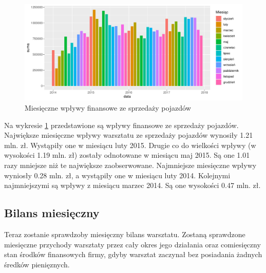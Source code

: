 \documentclass{article}\usepackage[]{graphicx}\usepackage[]{xcolor}
\makeatletter
\def\maxwidth{ %
  \ifdim\Gin@nat@width>\linewidth
    \linewidth
  \else
    \Gin@nat@width
  \fi
}
\newenvironment{knitrout}{}{} %
\makeatother
\begin{document}
\begin{knitrout}
\color{fgcolor}\begin{figure}[H]

{\centering \includegraphics[width=\maxwidth]{figure/fig_samochody_wplywy-1} 

}

\caption[Miesięczne wpływy finansowe ze sprzedaży pojazdów]{Miesięczne wpływy finansowe ze sprzedaży pojazdów}\label{fig:fig_samochody_wplywy}
\end{figure}

\end{knitrout}

Na wykresie \ref{fig:fig_samochody_wplywy} przedstawione są wpływy finansowe ze sprzedaży pojazdów. 
Największe miesięczne wpływy warsztatu ze sprzedaży pojazdów wynosiły 1.21 mln. zł. Wystąpiły one w miesiącu luty 2015. 
Drugie co do wielkości wpływy (w wysokości 1.19 mln. zł) zostały odnotowane w miesiącu maj 2015. Są one 1.01 razy mniejsze niż te największe zaobserwowane.
Najmniejsze miesięczne wpływy wyniosły 0.28 mln. zł, a wystąpiły one w miesiącu luty 2014.
Kolejnymi najmniejszymi są wpływy z miesiącu marzec 2014. Są one wysokości 0.47 mln. zł.


\subsection{Bilans miesięczny}

Teraz zostanie sprawdzoby miesięczny bilans warsztatu. Zostaną sprawdzone miesięczne przychody warsztaty przez cały okres jego działania oraz comiesięczny stan środków finansowych firmy, gdyby warsztat zaczynał bez posiadania żadnych średków pienięznych.
\end{document}
